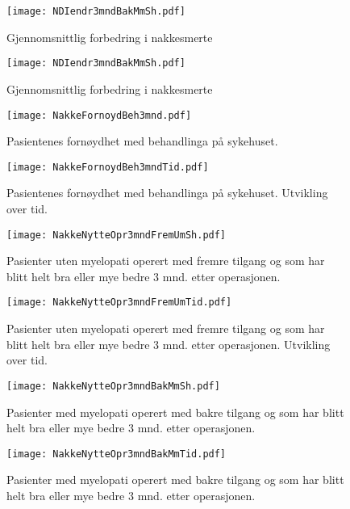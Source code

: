 \documentclass[presentation,xcolor=pdftex,dvipsnames,table]{beamer}\usepackage[]{graphicx}\usepackage[]{color}
\begin{document}
\begin{tiny}
\begin{frame}[fragile]
\begin{figure}[ht]
\centering
\texttt{[image: NDIendr3mndBakMmSh.pdf]}
\caption{Gjennomsnittlig forbedring i nakkesmerte}
\end{figure}
\end{frame}

\begin{frame}[fragile]
\begin{figure}[ht]
\centering
\texttt{[image: NDIendr3mndBakMmSh.pdf]}
\caption{Gjennomsnittlig forbedring i nakkesmerte}
\end{figure}
\end{frame}

\begin{frame}[fragile]
\begin{figure}[ht]
\centering
\texttt{[image: NakkeFornoydBeh3mnd.pdf]}
\caption{Pasientenes fornøydhet med behandlinga på sykehuset. }
\end{figure}
\end{frame}

\begin{frame}[fragile]
\begin{figure}[ht]
\centering
\texttt{[image: NakkeFornoydBeh3mndTid.pdf]}
\caption{Pasientenes fornøydhet med behandlinga på sykehuset. Utvikling over tid. }
\end{figure}
\end{frame}


\begin{frame}[fragile]
\begin{figure}[ht]
\centering
\texttt{[image: NakkeNytteOpr3mndFremUmSh.pdf]}
\caption{Pasienter uten myelopati operert med fremre tilgang og som har blitt helt bra eller mye bedre 3 mnd. etter operasjonen. }
\end{figure}
\end{frame}

\begin{frame}[fragile]
\begin{figure}[ht]
\centering
\texttt{[image: NakkeNytteOpr3mndFremUmTid.pdf]}
\caption{Pasienter uten myelopati operert med fremre tilgang og som har blitt helt bra eller mye bedre 3 mnd. etter operasjonen. Utvikling over tid. }
\end{figure}
\end{frame}

\begin{frame}[fragile]
\begin{figure}[ht]
\centering
\texttt{[image: NakkeNytteOpr3mndBakMmSh.pdf]}
\caption{Pasienter med myelopati operert med bakre tilgang og som har blitt helt bra eller mye bedre 3 mnd. etter operasjonen. }
\end{figure}
\end{frame}

\begin{frame}[fragile]
\begin{figure}[ht]
\centering
\texttt{[image: NakkeNytteOpr3mndBakMmTid.pdf]}
\caption{Pasienter med myelopati operert med bakre tilgang og som har blitt helt bra eller mye bedre 3 mnd. etter operasjonen.}
\end{figure}
\end{frame}

\end{tiny}
\end{document}

